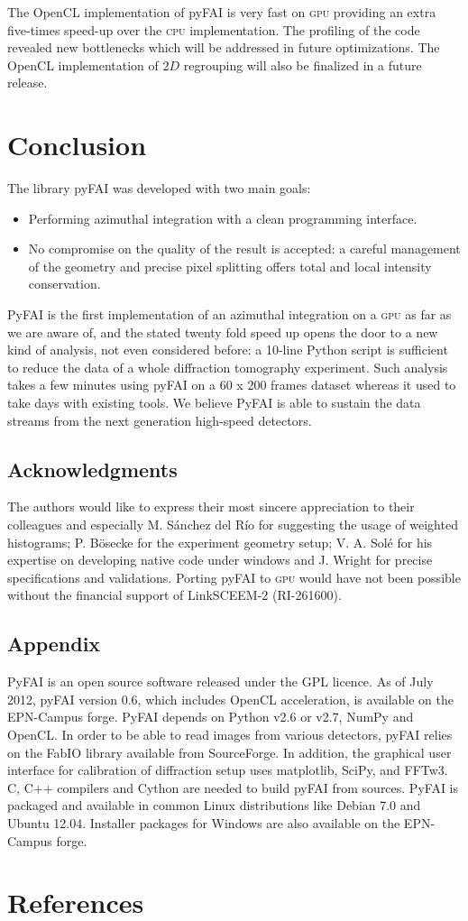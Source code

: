 \documentclass[a4paper]{jpconf}
\begin{document}
The OpenCL implementation of pyFAI is very fast on \textsc{gpu} providing an
extra five-times speed-up over the \textsc{cpu} implementation. The profiling of the code revealed new
bottlenecks which will be addressed in future optimizations. The OpenCL
implementation of $2D$ regrouping will also be finalized in a future release.

\section{Conclusion}
The library pyFAI was developed with two main goals:
\begin{itemize}
\item Performing azimuthal integration with a clean programming interface.
\item No compromise on the quality of the result is accepted: a careful
management of the geometry and precise pixel splitting offers total and local intensity
conservation.
\end{itemize}
PyFAI is the first implementation of an azimuthal integration on
a  \textsc{gpu} as far as we are aware of, and the stated twenty fold speed up
opens the door to a new kind of analysis, not even considered before:
a 10-line Python script is sufficient to reduce the data of a whole
diffraction tomography experiment. Such analysis takes a few minutes using
pyFAI on a 60 x 200 frames dataset whereas it used to take days with existing
tools.
We believe PyFAI is able to sustain the data streams from the next generation
high-speed detectors.

\subsection*{Acknowledgments}
The authors would like to express their most sincere appreciation to their
colleagues and especially M. S\'anchez del R\'io for suggesting
the usage of weighted histograms; P. B\"osecke for the experiment geometry
setup; V. A. Sol\'e for his expertise on developing native code under windows and
J. Wright for precise specifications and validations. Porting
pyFAI to \textsc{gpu} would have not been possible without the financial
support of LinkSCEEM-2 (RI-261600).

\subsection*{Appendix}
PyFAI is an open source software released under the GPL licence.
As of July 2012, pyFAI version 0.6, which includes OpenCL
acceleration, is available on the EPN-Campus forge\cite{forge}.
PyFAI depends on Python v2.6 or v2.7, NumPy\cite{numpy} and OpenCL\cite{opencl}.
In order to be able to read images from various detectors, pyFAI relies on the
FabIO\cite{fabio} library available from SourceForge.  
In addition, the graphical user interface for calibration of diffraction setup
uses matplotlib\cite{matplotlib}, SciPy\cite{scipy}, and FFTw3\cite{fftw}.
C, C++ compilers and Cython\cite{cython} are needed to build pyFAI from
sources.
PyFAI is packaged and available in common Linux distributions like Debian
7.0 and Ubuntu 12.04. Installer packages for Windows are also
available on the EPN-Campus forge.

\section*{References}


\end{document}
